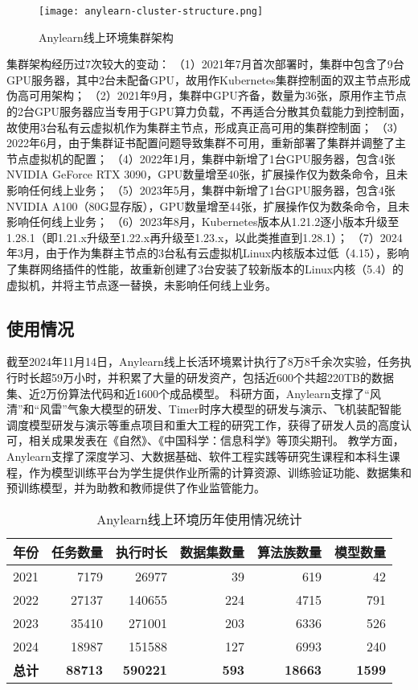 \begin{figure}
  \centering
  \texttt{[image: anylearn-cluster-structure.png]}
  \caption{Anylearn线上环境集群架构}
  \label{fig:cluster}
\end{figure}

集群架构经历过7次较大的变动：
（1）2021年7月首次部署时，集群中包含了9台GPU服务器，其中2台未配备GPU，故用作Kubernetes集群控制面的双主节点形成伪高可用架构；
（2）2021年9月，集群中GPU齐备，数量为36张，原用作主节点的2台GPU服务器应当专用于GPU算力负载，不再适合分散其负载能力到控制面，故使用3台私有云虚拟机作为集群主节点，形成真正高可用的集群控制面； 
（3）2022年6月，由于集群证书配置问题导致集群不可用，重新部署了集群并调整了主节点虚拟机的配置；
（4）2022年1月，集群中新增了1台GPU服务器，包含4张NVIDIA GeForce RTX 3090，GPU数量增至40张，扩展操作仅为数条命令，且未影响任何线上业务；
（5）2023年5月，集群中新增了1台GPU服务器，包含4张NVIDIA A100（80G显存版），GPU数量增至44张，扩展操作仅为数条命令，且未影响任何线上业务；
（6）2023年8月，Kubernetes版本从1.21.2逐小版本升级至1.28.1（即1.21.x升级至1.22.x再升级至1.23.x，以此类推直到1.28.1）；
（7）2024年3月，由于作为集群主节点的3台私有云虚拟机Linux内核版本过低（4.15），影响了集群网络插件的性能，故重新创建了3台安装了较新版本的Linux内核（5.4）的虚拟机，并将主节点逐一替换，未影响任何线上业务。

\subsection{使用情况}
截至2024年11月14日，Anylearn线上长活环境累计执行了8万8千余次实验，任务执行时长超59万小时，并积累了大量的研发资产，包括近600个共超220TB的数据集、近2万份算法代码和近1600个成品模型。
科研方面，Anylearn支撑了“风清”和“风雷”气象大模型的研发、Timer时序大模型的研发与演示、飞机装配智能调度模型研发与演示等重点项目和重大工程的研究工作，获得了研发人员的高度认可，相关成果发表在《自然》、《中国科学：信息科学》等顶尖期刊。
教学方面，Anylearn支撑了深度学习、大数据基础、软件工程实践等研究生课程和本科生课程，作为模型训练平台为学生提供作业所需的计算资源、训练验证功能、数据集和预训练模型，并为助教和教师提供了作业监管能力。

\begin{table}
  \centering
  \caption{Anylearn线上环境历年使用情况统计}
  \begin{tabular}{crrrrr}
    \toprule
    \multicolumn{1}{c}{年份} & \multicolumn{1}{c}{任务数量} & \multicolumn{1}{c}{执行时长} & \multicolumn{1}{c}{数据集数量} & \multicolumn{1}{c}{算法族数量} & \multicolumn{1}{c}{模型数量} \\
    \midrule
    2021 & 7179 & 26977 & 39 & 619 & 42 \\
    2022 & 27137 & 140655 & 224 & 4715 & 791 \\
    2023 & 35410 & 271001 & 203 & 6336 & 526 \\
    2024 & 18987 & 151588 & 127 & 6993 & 240 \\
    \textbf{总计} & \textbf{88713} & \textbf{590221} & \textbf{593} & \textbf{18663} & \textbf{1599} \\
    \bottomrule
  \end{tabular}
  \label{tab:stats}
\end{table}

